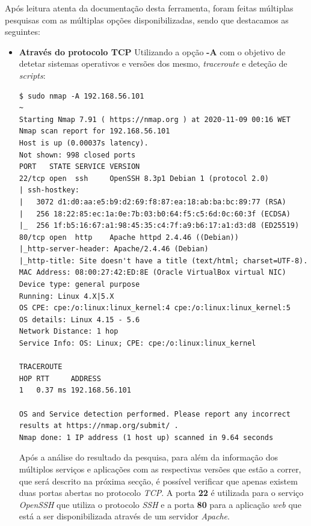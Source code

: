 \documentclass[10pt,english]{article}
\begin{document}
\par Após leitura atenta da documentação desta ferramenta, foram feitas múltiplas pesquisas com as múltiplas opções disponibilizadas, sendo que destacamos as seguintes:
\begin{itemize}
    \item {\textbf{Através do protocolo TCP}}
    \newline
    Utilizando a opção \textbf{-A} com o objetivo de detetar sistemas operativos e versões dos mesmo, \textit{traceroute} e deteção de \textit{scripts}:
    
    \begin{lstlisting}
$ sudo nmap -A 192.168.56.101                                                 ~
Starting Nmap 7.91 ( https://nmap.org ) at 2020-11-09 00:16 WET
Nmap scan report for 192.168.56.101
Host is up (0.00037s latency).
Not shown: 998 closed ports
PORT   STATE SERVICE VERSION
22/tcp open  ssh     OpenSSH 8.3p1 Debian 1 (protocol 2.0)
| ssh-hostkey:
|   3072 d1:d0:aa:e5:b9:d2:69:f8:87:ea:18:ab:ba:bc:89:77 (RSA)
|   256 18:22:85:ec:1a:0e:7b:03:b0:64:f5:c5:6d:0c:60:3f (ECDSA)
|_  256 1f:b5:16:67:a1:98:45:35:c4:7f:a9:b6:17:a1:d3:d8 (ED25519)
80/tcp open  http    Apache httpd 2.4.46 ((Debian))
|_http-server-header: Apache/2.4.46 (Debian)
|_http-title: Site doesn't have a title (text/html; charset=UTF-8).
MAC Address: 08:00:27:42:ED:8E (Oracle VirtualBox virtual NIC)
Device type: general purpose
Running: Linux 4.X|5.X
OS CPE: cpe:/o:linux:linux_kernel:4 cpe:/o:linux:linux_kernel:5
OS details: Linux 4.15 - 5.6
Network Distance: 1 hop
Service Info: OS: Linux; CPE: cpe:/o:linux:linux_kernel

TRACEROUTE
HOP RTT     ADDRESS
1   0.37 ms 192.168.56.101

OS and Service detection performed. Please report any incorrect results at https://nmap.org/submit/ .
Nmap done: 1 IP address (1 host up) scanned in 9.64 seconds
    \end{lstlisting}
    
    \par Após a análise do resultado da pesquisa, para além da informação dos múltiplos serviços e aplicações com as respectivas versões que estão a correr, que será descrito na próxima secção, é possível verificar que apenas existem duas portas abertas no protocolo \textit{TCP}. A porta \textbf{22} é utilizada para o serviço \textit{OpenSSH} que utiliza o protocolo \textit{SSH} e a porta \textbf{80} para a aplicação \textit{web} que está a ser disponibilizada através de um servidor \textit{Apache}.
    

\end{itemize}
\end{document}
